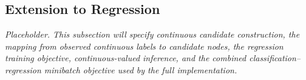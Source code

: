 \documentclass[11pt]{article}
\begin{document}
\subsection{Extension to Regression}
\label{sec:regression-placeholder}

\emph{Placeholder.  This subsection will specify continuous candidate
construction, the mapping from observed continuous labels to candidate
nodes, the regression training objective, continuous-valued inference, and
the combined classification--regression minibatch objective used by the
full implementation.}
\end{document}
